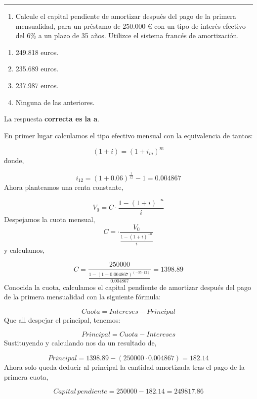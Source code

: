 \documentclass[
  letterpaper,
  DIV=11,
  numbers=noendperiod]{scrreprt}
\providecommand{\tightlist}{%
  \setlength{\itemsep}{0pt}\setlength{\parskip}{0pt}}\usepackage{longtable,booktabs,array}
\begin{document}
\begin{center}\rule{0.5\linewidth}{0.5pt}\end{center}

\begin{enumerate}
\def\labelenumi{\arabic{enumi}.}
\setcounter{enumi}{93}
\tightlist
\item
  Calcule el capital pendiente de amortizar después del pago de la
  primera mensualidad, para un préstamo de 250.000 € con un tipo de
  interés efectivo del 6\% a un plazo de 35 años. Utilizce el sistema
  francés de amortización.
\end{enumerate}

\begin{enumerate}
\def\labelenumi{\alph{enumi}.}
\item
  249.818 euros.
\item
  235.689 euros.
\item
  237.987 euros.
\item
  Ninguna de las anteriores.
\end{enumerate}

\begin{tcolorbox}[enhanced jigsaw, left=2mm, opacityback=0, colback=white, breakable, arc=.35mm, bottomrule=.15mm, rightrule=.15mm, toprule=.15mm, leftrule=.75mm, colframe=quarto-callout-tip-color-frame]
\begin{minipage}[t]{5.5mm}
\textcolor{quarto-callout-tip-color}{\faLightbulb}
\end{minipage}%
\begin{minipage}[t]{\textwidth - 5.5mm}

La respuesta \textbf{correcta es la a}.

En primer lugar calculamos el tipo efectivo mensual con la equivalencia
de tantos:

\[(1+i)=(1+ i _m)^m\] donde,

\[i_{12}=(1+0.06)^{\frac{1}{12}}-1=0.004867\] Ahora planteamos una renta
constante,

\[V_0=C\cdot\frac{1-\left(1+i\right)^{-n}}{i}\] Despejamos la cuota
mensual, \[C=\cdot\frac{ V_0}{ \frac{1-\left(1+i\right)^{-n}}{i}}\] y
calculamos,

\[C=\frac{ 250000}{ \frac{1-\left(1+0.004867\right)^{(-35\cdot12)}}{0.004867}}=1398.89\]
Conocida la cuota, calculamos el capital pendiente de amortizar después
del pago de la primera mensualidad con la siguiente fórmula:

\[ Cuota=Intereses-Principal\] Que all despejar el principal, tenemos:

\[ Principal=Cuota-Intereses\] Sustituyendo y calculando nos da un
resultado de,

\[ Principal=1398.89-(250000\cdot 0.004867)=182.14\] Ahora solo queda
deducir al principal la cantidad amortizada tras el pago de la primera
cuota,

\[Capital\,pendiente=250000-182.14=249817.86\]

\end{minipage}%
\end{tcolorbox}
\end{document}
